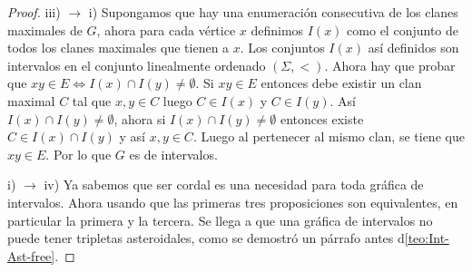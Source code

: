 \begin{proof}
    iii) $\to$ i) Supongamos que hay una enumeración consecutiva de los clanes
    maximales de $G$, ahora para cada vértice $x$ definimos $I(x)$ como el
    conjunto de todos los clanes maximales que tienen a $x$. Los conjuntos
    $I(x)$ así definidos son intervalos en el conjunto linealmente ordenado
    $(\Sigma,<)$. Ahora hay que probar que $xy\in E \Leftrightarrow I(x)\cap
    I(y)\neq \emptyset$. Si $xy\in E$ entonces debe existir un clan maximal $C$
    tal que $x,y \in C$ luego $C\in I(x)$ y $C\in I(y)$. Así $I(x)\cap I(y)\neq
    \emptyset$, ahora si $I(x)\cap I(y)\neq \emptyset$ entonces existe $C\in
    I(x)\cap I(y)$ y así $x,y\in C$. Luego al pertenecer al mismo clan, se tiene
    que $xy\in E$. Por lo que $G$ es de intervalos.
    
    i) $\to $ iv) Ya sabemos que ser cordal es una necesidad para toda gráfica
    de intervalos. Ahora usando que las primeras tres proposiciones son
    equivalentes, en particular la primera y la tercera. Se llega a que una
    gráfica de intervalos no puede tener tripletas asteroidales, como se
    demostró un párrafo antes d\cref{teo:Int-Ast-free}.    


\end{proof}

